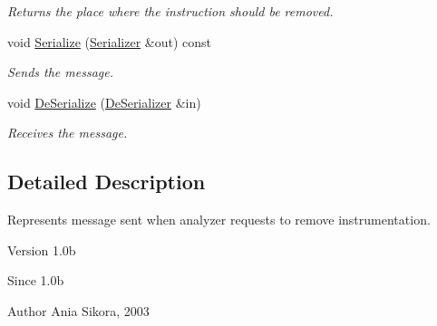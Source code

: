\begin{DoxyCompactItemize}
\begin{DoxyCompactList}\small\item\em Returns the place where the instruction should be removed. \end{DoxyCompactList}\item 
\hypertarget{class_common_1_1_remove_instr_request_ac8c54f924e923d990eec86f6fe3d0594}{void \hyperlink{class_common_1_1_remove_instr_request_ac8c54f924e923d990eec86f6fe3d0594}{Serialize} (\hyperlink{class_common_1_1_serializer}{Serializer} \&out) const }\label{class_common_1_1_remove_instr_request_ac8c54f924e923d990eec86f6fe3d0594}

\begin{DoxyCompactList}\small\item\em Sends the message. \end{DoxyCompactList}\item 
\hypertarget{class_common_1_1_remove_instr_request_a0d4fd00d0e6a4579e5b180c07959d239}{void \hyperlink{class_common_1_1_remove_instr_request_a0d4fd00d0e6a4579e5b180c07959d239}{De\-Serialize} (\hyperlink{class_common_1_1_de_serializer}{De\-Serializer} \&in)}\label{class_common_1_1_remove_instr_request_a0d4fd00d0e6a4579e5b180c07959d239}

\begin{DoxyCompactList}\small\item\em Receives the message. \end{DoxyCompactList}\end{DoxyCompactItemize}


\subsection{Detailed Description}
Represents message sent when analyzer requests to remove instrumentation. 

\begin{DoxyVersion}{Version}
1.\-0b 
\end{DoxyVersion}
\begin{DoxySince}{Since}
1.\-0b 
\end{DoxySince}
\begin{DoxyAuthor}{Author}
Ania Sikora, 2003 
\end{DoxyAuthor}



